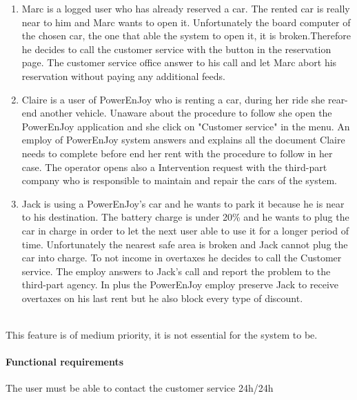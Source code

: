 \begin{enumerate}
	\item Marc is a logged user who has already reserved a car. The rented car is really near to him and Marc wants to open it. Unfortunately the board computer of the chosen car, the one that able the system to open it, it is broken.Therefore he decides to call the customer service with the button in the reservation page. The customer service office answer to his call and let Marc abort his reservation without paying any additional feeds.
	\item Claire is a user of PowerEnJoy who is renting a car, during her ride she rear-end another vehicle. Unaware about the procedure to follow she open the PowerEnJoy application and she click on "Customer service" in the menu. An employ of PowerEnJoy system answers and explains all the document Claire needs to complete before end her rent with the procedure to follow in her case. The operator opens also a Intervention request with the third-part company who is responsible to maintain and repair the cars of the system.
	\item Jack is using a PowerEnJoy's car and he wants to park it because he is near to his destination. The battery charge is under 20\% and he wants to plug the car in charge in order to let the next user able to use it for a longer period of time. Unfortunately the nearest safe area is broken and Jack cannot plug the car into charge. To not income in overtaxes he decides to call the Customer service. The employ answers to Jack's call and report the problem to the third-part agency. In plus the PowerEnJoy employ preserve Jack to receive overtaxes on his last rent but he also block every type of discount.
\end{enumerate}
 \ \\
This feature is of medium priority, it is not essential for the system to be.
\paragraph {Functional requirements }
\begin{itemize}
	 The user must be able to contact the customer service 24h/24h
\end{itemize}
 \ \\
\newpage

